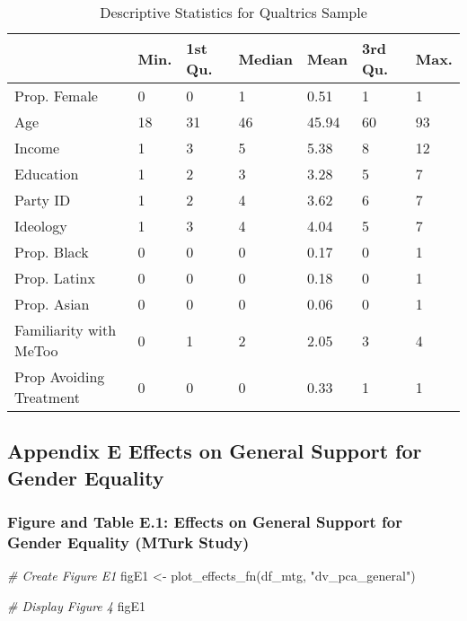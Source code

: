 \documentclass[
]{article}
\newenvironment{Shaded}{\begin{snugshade}}{\end{snugshade}}
\newcommand{\CommentTok}[1]{\textcolor[rgb]{0.56,0.35,0.01}{\textit{#1}}}
\newcommand{\FunctionTok}[1]{\textcolor[rgb]{0.00,0.00,0.00}{#1}}
\newcommand{\NormalTok}[1]{#1}
\newcommand{\OtherTok}[1]{\textcolor[rgb]{0.56,0.35,0.01}{#1}}
\newcommand{\StringTok}[1]{\textcolor[rgb]{0.31,0.60,0.02}{#1}}
\begin{document}
\begin{table}[!h]

\caption{\label{tab:tabD2}Descriptive Statistics for Qualtrics Sample}
\centering
\begin{tabular}[t]{lllllll}
\toprule
  & Min. & 1st Qu. & Median & Mean & 3rd Qu. & Max.\\
\midrule
Prop. Female & 0 & 0 & 1 & 0.51 & 1 & 1\\
Age & 18 & 31 & 46 & 45.94 & 60 & 93\\
Income & 1 & 3 & 5 & 5.38 & 8 & 12\\
Education & 1 & 2 & 3 & 3.28 & 5 & 7\\
Party ID & 1 & 2 & 4 & 3.62 & 6 & 7\\
\addlinespace
Ideology & 1 & 3 & 4 & 4.04 & 5 & 7\\
Prop. Black & 0 & 0 & 0 & 0.17 & 0 & 1\\
Prop. Latinx & 0 & 0 & 0 & 0.18 & 0 & 1\\
Prop. Asian & 0 & 0 & 0 & 0.06 & 0 & 1\\
Familiarity with MeToo & 0 & 1 & 2 & 2.05 & 3 & 4\\
\addlinespace
Prop Avoiding Treatment & 0 & 0 & 0 & 0.33 & 1 & 1\\
\bottomrule
\end{tabular}
\end{table}

\hypertarget{appendix-e-effects-on-general-support-for-gender-equality}{%
\subsection{Appendix E Effects on General Support for Gender
Equality}\label{appendix-e-effects-on-general-support-for-gender-equality}}

\setcounter{table}{0}
\renewcommand{\thetable}{E.\arabic{table}}
\setcounter{figure}{0}
\renewcommand{\thefigure}{E.\arabic{figure}}

\hypertarget{figure-and-table-e.1-effects-on-general-support-for-gender-equality-mturk-study}{%
\subsubsection{Figure and Table E.1: Effects on General Support for
Gender Equality (MTurk
Study)}\label{figure-and-table-e.1-effects-on-general-support-for-gender-equality-mturk-study}}

\begin{Shaded}
\begin{Highlighting}[]
\CommentTok{\# Create Figure E1}
\NormalTok{figE1 }\OtherTok{\textless{}{-}} \FunctionTok{plot\_effects\_fn}\NormalTok{(df\_mtg, }\StringTok{"dv\_pca\_general"}\NormalTok{)}

\CommentTok{\# Display Figure 4}
\NormalTok{figE1 }
\end{Highlighting}
\end{Shaded}
\end{document}
